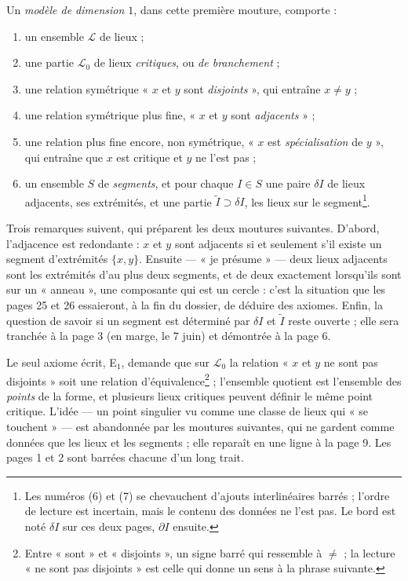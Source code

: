 \documentclass[11pt,a4paper]{article}
\begin{document}
Un \emph{modèle de dimension $1$}, dans cette première mouture, comporte :
\begin{enumerate}
\item[(1)] un ensemble $\mathcal{L}$ de lieux ;
\item[(2)] une partie $\mathcal{L}_{0}$ de lieux \emph{critiques}, ou \emph{de
branchement} ;
\item[(3)] une relation symétrique « $x$ et $y$ sont \emph{disjoints} », qui
entraîne $x \neq y$ ;
\item[(4)] une relation symétrique plus fine, « $x$ et $y$ sont
\emph{adjacents} » ;
\item[(5)] une relation plus fine encore, non symétrique, « $x$ est
\emph{spécialisation} de $y$ », qui entraîne que $x$ est critique et $y$ ne
l'est pas ;
\item[(6)--(8)] un ensemble $S$ de \emph{segments}, et pour chaque $I \in S$
une paire $\delta I$ de lieux adjacents, ses extrémités, et une partie
$\widetilde{I} \supset \delta I$, les lieux sur le segment\footnote{Les
numéros (6) et (7) se chevauchent d'ajouts interlinéaires barrés ; l'ordre de
lecture est incertain, mais le contenu des données ne l'est pas. Le bord est
noté $\delta I$ sur ces deux pages, $\partial I$ ensuite.}.
\end{enumerate}

Trois remarques suivent, qui préparent les deux moutures suivantes. D'abord,
l'adjacence est redondante : $x$ et $y$ sont adjacents si et seulement s'il
existe un segment d'extrémités $\{x,y\}$. Ensuite --- « je présume » --- deux
lieux adjacents sont les extrémités d'au plus deux segments, et de deux
exactement lorsqu'ils sont sur un « anneau », une composante qui est un
cercle : c'est la situation que les pages 25 et 26 essaieront, à la fin du
dossier, de déduire des axiomes. Enfin, la question de savoir si un segment
est déterminé par $\delta I$ et $\widetilde{I}$ reste ouverte ; elle sera
tranchée à la page 3 (en marge, le 7 juin) et démontrée à la page 6.

Le seul axiome écrit, E$_{1}$, demande que sur $\mathcal{L}_{0}$ la relation
« $x$ et $y$ ne sont pas disjoints » soit une relation
d'équivalence\footnote{Entre « sont » et « disjoints », un signe barré qui
ressemble à $\neq$ ; la lecture « ne sont pas disjoints » est celle qui donne
un sens à la phrase suivante.} ; l'ensemble quotient est l'ensemble des
\emph{points} de la forme, et plusieurs lieux critiques peuvent définir le
même point critique. L'idée --- un point singulier vu comme une classe de
lieux qui « se touchent » --- est abandonnée par les moutures suivantes, qui
ne gardent comme données que les lieux et les segments ; elle reparaît en une
ligne à la page 9. Les pages 1 et 2 sont barrées chacune d'un long trait.
\end{document}
